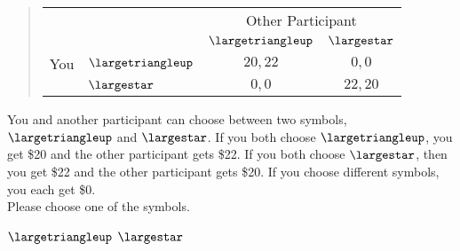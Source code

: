 \documentclass[11pt]{article}
\begin{document}
\begin{tcolorbox}
\begin{quote}
\begin{center}
\begin{tabular}{llcc}
    & & \multicolumn{2}{c}{Other Participant}  \\
& & $\largetriangleup$ & $\largestar$  \\ \cline{3-4}
You & $\largetriangleup$ & \multicolumn{1}{|c|}{$20,22$} & \multicolumn{1}{c|}{$0,0$}  \\ \cline{3-4}
& $\largestar$ & \multicolumn{1}{|c|}{$0,0$} & \multicolumn{1}{c|}{$22,20$}  \\ \cline{3-4}
\end{tabular}
\end{center}
\end{quote}


You and another participant can choose between two symbols, $\largetriangleup$ and $\largestar$. If you both choose $\largetriangleup$, you get \$20 and the other participant gets \$22. If you both choose $\largestar$, then you get \$22 and the other participant gets \$20. If you choose different symbols, you each get \$0.\\

Please choose one of the symbols.\\

\begin{center}
$\largetriangleup$ \qquad $\largestar$
\end{center}
\end{tcolorbox}
\end{document}
